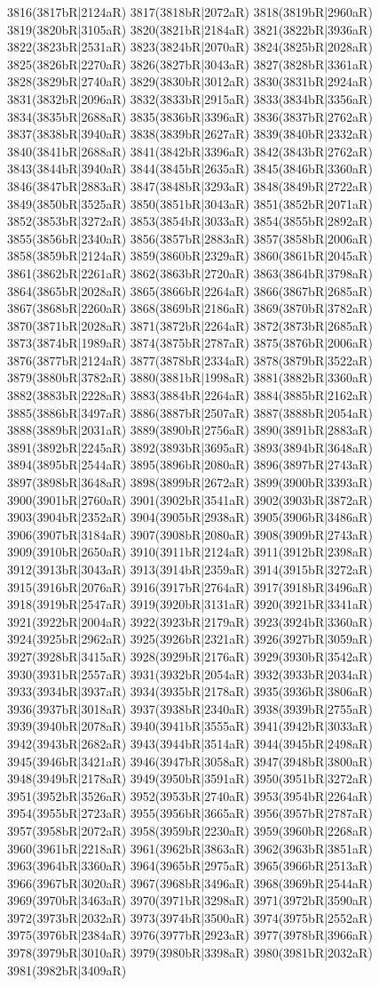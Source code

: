 3816(3817bR|2124aR) 3817(3818bR|2072aR) 3818(3819bR|2960aR) 3819(3820bR|3105aR) 3820(3821bR|2184aR) 3821(3822bR|3936aR) 3822(3823bR|2531aR) 3823(3824bR|2070aR) 3824(3825bR|2028aR) 3825(3826bR|2270aR) 3826(3827bR|3043aR) 3827(3828bR|3361aR) 3828(3829bR|2740aR) 3829(3830bR|3012aR) 3830(3831bR|2924aR) 3831(3832bR|2096aR) 3832(3833bR|2915aR) 3833(3834bR|3356aR) 3834(3835bR|2688aR) 3835(3836bR|3396aR) 3836(3837bR|2762aR) 3837(3838bR|3940aR) 3838(3839bR|2627aR) 3839(3840bR|2332aR) 3840(3841bR|2688aR) 3841(3842bR|3396aR) 3842(3843bR|2762aR) 3843(3844bR|3940aR) 3844(3845bR|2635aR) 3845(3846bR|3360aR) 3846(3847bR|2883aR) 3847(3848bR|3293aR) 3848(3849bR|2722aR) 3849(3850bR|3525aR) 3850(3851bR|3043aR) 3851(3852bR|2071aR) 3852(3853bR|3272aR) 3853(3854bR|3033aR) 3854(3855bR|2892aR) 3855(3856bR|2340aR) 3856(3857bR|2883aR) 3857(3858bR|2006aR) 3858(3859bR|2124aR) 3859(3860bR|2329aR) 3860(3861bR|2045aR) 3861(3862bR|2261aR) 3862(3863bR|2720aR) 3863(3864bR|3798aR) 3864(3865bR|2028aR) 3865(3866bR|2264aR) 3866(3867bR|2685aR) 3867(3868bR|2260aR) 3868(3869bR|2186aR) 3869(3870bR|3782aR) 3870(3871bR|2028aR) 3871(3872bR|2264aR) 3872(3873bR|2685aR) 3873(3874bR|1989aR) 3874(3875bR|2787aR) 3875(3876bR|2006aR) 3876(3877bR|2124aR) 3877(3878bR|2334aR) 3878(3879bR|3522aR) 3879(3880bR|3782aR) 3880(3881bR|1998aR) 3881(3882bR|3360aR) 3882(3883bR|2228aR) 3883(3884bR|2264aR) 3884(3885bR|2162aR) 3885(3886bR|3497aR) 3886(3887bR|2507aR) 3887(3888bR|2054aR) 3888(3889bR|2031aR) 3889(3890bR|2756aR) 3890(3891bR|2883aR) 3891(3892bR|2245aR) 3892(3893bR|3695aR) 3893(3894bR|3648aR) 3894(3895bR|2544aR) 3895(3896bR|2080aR) 3896(3897bR|2743aR) 3897(3898bR|3648aR) 3898(3899bR|2672aR) 3899(3900bR|3393aR) 3900(3901bR|2760aR) 3901(3902bR|3541aR) 3902(3903bR|3872aR) 3903(3904bR|2352aR) 3904(3905bR|2938aR) 3905(3906bR|3486aR) 3906(3907bR|3184aR) 3907(3908bR|2080aR) 3908(3909bR|2743aR) 3909(3910bR|2650aR) 3910(3911bR|2124aR) 3911(3912bR|2398aR) 3912(3913bR|3043aR) 3913(3914bR|2359aR) 3914(3915bR|3272aR) 3915(3916bR|2076aR) 3916(3917bR|2764aR) 3917(3918bR|3496aR) 3918(3919bR|2547aR) 3919(3920bR|3131aR) 3920(3921bR|3341aR) 3921(3922bR|2004aR) 3922(3923bR|2179aR) 3923(3924bR|3360aR) 3924(3925bR|2962aR) 3925(3926bR|2321aR) 3926(3927bR|3059aR) 3927(3928bR|3415aR) 3928(3929bR|2176aR) 3929(3930bR|3542aR) 3930(3931bR|2557aR) 3931(3932bR|2054aR) 3932(3933bR|2034aR) 3933(3934bR|3937aR) 3934(3935bR|2178aR) 3935(3936bR|3806aR) 3936(3937bR|3018aR) 3937(3938bR|2340aR) 3938(3939bR|2755aR) 3939(3940bR|2078aR) 3940(3941bR|3555aR) 3941(3942bR|3033aR) 3942(3943bR|2682aR) 3943(3944bR|3514aR) 3944(3945bR|2498aR) 3945(3946bR|3421aR) 3946(3947bR|3058aR) 3947(3948bR|3800aR) 3948(3949bR|2178aR) 3949(3950bR|3591aR) 3950(3951bR|3272aR) 3951(3952bR|3526aR) 3952(3953bR|2740aR) 3953(3954bR|2264aR) 3954(3955bR|2723aR) 3955(3956bR|3665aR) 3956(3957bR|2787aR) 3957(3958bR|2072aR) 3958(3959bR|2230aR) 3959(3960bR|2268aR) 3960(3961bR|2218aR) 3961(3962bR|3863aR) 3962(3963bR|3851aR) 3963(3964bR|3360aR) 3964(3965bR|2975aR) 3965(3966bR|2513aR) 3966(3967bR|3020aR) 3967(3968bR|3496aR) 3968(3969bR|2544aR) 3969(3970bR|3463aR) 3970(3971bR|3298aR) 3971(3972bR|3590aR) 3972(3973bR|2032aR) 3973(3974bR|3500aR) 3974(3975bR|2552aR) 3975(3976bR|2384aR) 3976(3977bR|2923aR) 3977(3978bR|3966aR) 3978(3979bR|3010aR) 3979(3980bR|3398aR) 3980(3981bR|2032aR) 3981(3982bR|3409aR) 